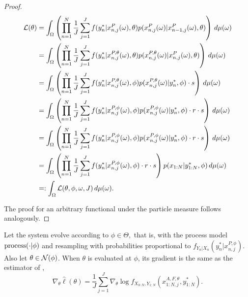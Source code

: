 \documentclass{article}
\begin{document}
\begin{proof}
    
    \begin{align}
         \mathcal{L}(\theta) 
         &= \int_\Omega \left(
         \prod_{n=1}^N \frac{1}{J} \sum_{j=1}^J f(y_n^* | x_{n,j}^P(\omega), \theta) p(x_{n,j}^P(\omega) | x_{n-1,j}^P(\omega), \theta) \right) \, d\mu(\omega) \\
         &= \int_\Omega \left(
         \prod_{n=1}^N \frac{1}{J} \sum_{j=1}^J f(y_n^* | x_{n,j}^{P,\theta}(\omega), \theta) p(x_{n,j}^{P,\theta}(\omega) | x_{n,j}^P(\omega), \theta) \right) \, d\mu(\omega) \\
         &= \int_\Omega \left(
         \prod_{n=1}^N \frac{1}{J} \sum_{j=1}^J f(y_n^* | x_{n,j}^{P,\theta}(\omega), \phi) p(x_{n,j}^{P,\theta}(\omega) | y_n^*, \phi) \cdot s  \right) \, d\mu(\omega) \\
         &= \int_\Omega \left(
         \prod_{n=1}^N \frac{1}{J} \sum_{j=1}^J f(y_n^* | x_{n,j}^{P,\phi}(\omega), \phi) p(x_{n,j}^{P,\phi}(\omega) | y_n^*, \phi) \cdot r \cdot s \right) \, d\mu(\omega) \\
         &= \int_\Omega \left(
         \prod_{n=1}^N \frac{1}{J} \sum_{j=1}^J f(y_n^* | x_{n,j}^{P,\phi}(\omega), \phi) p(x_{n,j}^{P, \phi}(\omega) | y_n^*, \phi) \cdot r \cdot s \right) \, d\mu(\omega) \\
         &= \int_\Omega \left(
         \prod_{n=1}^N \frac{1}{J} \sum_{j=1}^J f(y_n^* | x_{n,j}^{P,\phi}(\omega), \phi) \cdot r \cdot s \right)  p(x_{1:N} | y_{1:N}^*, \phi) \,  d\mu(\omega) \\
         &=: \int_\Omega \mathcal{L}(\theta,\phi,\omega, J)\, d\mu(\omega).
     \end{align}

     The proof for an arbitrary functional under the particle measure follows analogously.
\end{proof}

\begin{lem}
    Let the system evolve according to $\phi \in \Theta,$ that is, with the process model $\text{process}(\cdot | \phi)$ and resampling with probabilities proportional to $f_{Y_n|X_n}(y_n^* | x_{n,j}^{P,\phi})$. Also let $\theta \in {\mathcal{N}}(\phi)$. When $\theta$ is evaluated at $\phi$, its gradient is the same as the estimator of \citet{doucet2011sf},
    \begin{equation}
        \nabla_\theta \hat\ell(\theta) = \frac{1}{J}\sum_{j=1}^J \nabla_\theta \log f_{X_{0:N}, Y_{1:N}}(x_{1:N,j}^{A, F,\theta}, y_{1:N}^*).
    \end{equation}
\end{lem}
\end{document}
